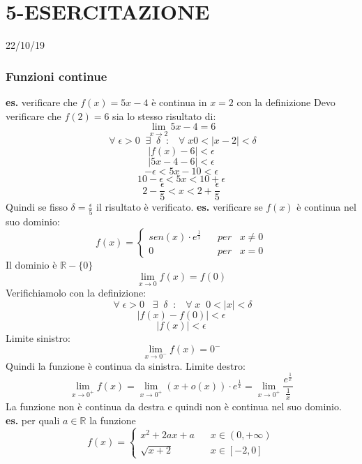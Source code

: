 \section*{5-ESERCITAZIONE}
22/10/19
\subsubsection*{Funzioni continue}
\textbf{es.} verificare che $f(x) = 5x -4$ è continua in $x=2$ con la definizione
\newline
Devo verificare che $f(2) = 6$ sia lo stesso risultato di:
\[
    \lim_{x\rightarrow 2} 5x-4 = 6
\]
\[
    \;\forall\; \epsilon > 0 \;\; \exists \;\; \delta \;\;:\;\; \;\forall\;x 0<|x-2|<\delta 
\]
\[
    |f(x) -6| < \epsilon
\]
\[
    |5x-4-6| < \epsilon
\]
\[
    -\epsilon < 5x-10< \epsilon
\]
\[
    10-\epsilon< 5x< 10 + \epsilon
\]
\[
    2- \frac{\epsilon}{5} < x < 2 + \frac{\epsilon}{5}
\]
Quindi se fisso $\delta = \frac{\epsilon}{5}$ il risultato è verificato.
\newline
\newline
\newline
\textbf{es.} verificare se $f(x)$ è continua nel suo dominio:
\[
    f(x) = \begin{cases}
        sen(x) \cdot e^{\frac{1}{x}} &\;\;\; per \;\;\; x\neq 0 \\
        0 & \;\;\;per \;\;\; x=0
    \end{cases}
\]
Il dominio è $\mathbb{R} - \{0\}$
\[
    \lim_{x\rightarrow 0 }f(x) = f(0)
\]
Verifichiamolo con la definizione:
\[
    \;\forall\; \epsilon> 0 \;\;\;\exists \;\; \delta \;\;:\;\; \;\forall\;x \;\; 0< |x|< \delta
\]
\[
    |f(x)-f(0)|<\epsilon
\]
\[
    |f(x)| < \epsilon
\]
Limite sinistro:
\[
    \lim_{x\rightarrow 0^-} f(x) = 0^-
\]
Quindi la funzione è continua da sinistra.
\newline
Limite destro:
\[
    \lim_{x\rightarrow 0^+} f(x) = \lim_{x\rightarrow 0^+}(x + o(x))\cdot  e ^{\frac{1}{x}} = \lim_{x\rightarrow 0^+} \frac{e^{\frac{1}{x}}}{\frac{1}{x}}
\]
La funzione non è continua da destra e quindi non è continua nel suo dominio.
\newline
\newline
\newline
\textbf{es.} per quali $ a \in \mathbb{R}$ la funzione
\[
    f(x) = \begin{cases}
        x^2 +2ax +a \;\;\;& x \in (0,+\infty) \\
        \sqrt{x+2}&x \in [-2,0]
    \end{cases}
\] 
